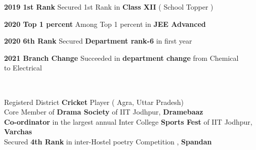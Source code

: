 \documentclass[a4paper]{MagicalCV}
\begin{document}
\begin{minipage}[t]{0.66\textwidth}
\bigskip
\vspace{\topsep} %
\begin{tightemize}
\begin{small}
\item  {\bf 2019  \hspace{1cm} 1st Rank} \hspace{0.9cm} Secured 1st Rank in {\bf Class XII} ( School Topper )
\item  {\bf 2020  \hspace{1cm} Top 1 percent} \hspace{0.37cm} Among Top 1 percent in {\bf JEE Advanced}
\item  {\bf 2020  \hspace{1cm} 6th Rank} \hspace{1.17cm} Secured {\bf Department rank-6 } in first year

\item  {\bf 2021  \hspace{1cm} Branch Change} \hspace{0.27cm} Succeeded in {\bf  department
change } from  Chemical\\ \hspace{4.65cm}to Electrical
\end{small}
\end{tightemize}
\sectionsep


 \\
\bigskip
\begin{small}
 \textbullet{} Registerd District {\bf Cricket} Player ( Agra, Uttar Pradesh)\\
 \textbullet{} Core Member of {\bf Drama Society} of IIT Jodhpur, {\bf Dramebaaz}\\
 \textbullet{} {\bf Co-ordinator} in the largest annual Inter College {\bf Sports Fest} of IIT Jodhpur, {\bf Varchas}\\
 \textbullet{} Secured {\bf 4th Rank} in inter-Hostel
poetry Competition , {\bf Spandan}
\end{small}
\sectionsep

\end{minipage} 
\end{document}
